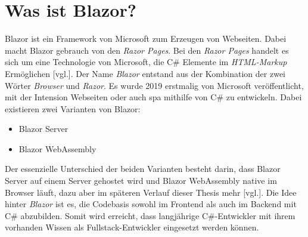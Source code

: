 \section{Was ist Blazor?}
\label{subsec:wasIstBlazor}
Blazor ist ein Framework von Microsoft zum Erzeugen von Webseiten. Dabei macht Blazor gebrauch
von den \emph{Razor Pages}. Bei den \emph{Razor Pages} handelt es sich um eine Technologie von
Microsoft, die C\# Elemente im \emph{HTML-Markup} Ermöglichen \cite{RazorPages}[vgl.].
Der Name \emph{Blazor} entstand aus der Kombination der zwei Wörter \emph{Browser} und
\emph{Razor}. Es wurde 2019 erstmalig von Microsoft
veröffentlicht, mit der Intension Webseiten oder auch \ac{spa} mithilfe von C\# zu entwickeln.
Dabei existieren zwei Varianten von Blazor:

\begin{itemize}
    \item Blazor Server
    \item Blazor WebAssembly
\end{itemize}
Der essenzielle Unterschied der beiden Varianten besteht darin, dass Blazor Server auf einem
Server gehostet wird und Blazor WebAssembly native im Browser läuft, dazu aber im späteren
Verlauf dieser Thesis mehr \cite{WasIstBlazor}[vgl.].
\newline
\newline
Die Idee hinter \emph{Blazor} ist es, die Codebasis sowohl im Frontend als auch im Backend mit
C\# abzubilden. Somit wird erreicht, dass langjährige C\#-Entwickler mit ihrem vorhanden Wissen
als Fullstack-Entwickler eingesetzt werden können.
